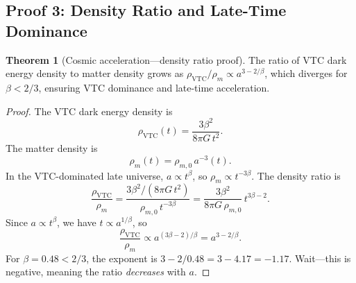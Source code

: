 \documentclass[11pt,a4paper]{article}
\theoremstyle{definition}
\newtheorem{theorem}{Theorem}[section]
\newcommand{\VTC}{\mathrm{VTC}}
\begin{document}
\subsection{Proof 3: Density Ratio and Late-Time Dominance}
\label{sec:thm3_ratio}

\begin{theorem}[Cosmic acceleration---density ratio proof]
The ratio of VTC dark energy density to matter density grows as $\rho_{\VTC}/\rho_m \propto a^{3-2/\beta}$, which diverges for $\beta < 2/3$, ensuring VTC dominance and late-time acceleration.
\end{theorem}

\begin{proof}
The VTC dark energy density is
\begin{equation}
\rho_{\VTC}(t) = \frac{3\beta^2}{8\pi G\,t^2}.
\end{equation}
The matter density is
\begin{equation}
\rho_m(t) = \rho_{m,0}\,a^{-3}(t).
\end{equation}
In the VTC-dominated late universe, $a \propto t^\beta$, so $\rho_m \propto t^{-3\beta}$. The density ratio is
\begin{equation}
\frac{\rho_{\VTC}}{\rho_m} = \frac{3\beta^2/(8\pi G\,t^2)}{\rho_{m,0}\,t^{-3\beta}} = \frac{3\beta^2}{8\pi G\,\rho_{m,0}}\,t^{3\beta - 2}.
\end{equation}
Since $a \propto t^\beta$, we have $t \propto a^{1/\beta}$, so
\begin{equation}
\boxed{\frac{\rho_{\VTC}}{\rho_m} \propto a^{(3\beta - 2)/\beta} = a^{3 - 2/\beta}.}
\end{equation}
For $\beta = 0.48 < 2/3$, the exponent is $3 - 2/0.48 = 3 - 4.17 = -1.17$. Wait---this is negative, meaning the ratio \textit{decreases} with $a$.


\end{proof}
\end{document}
